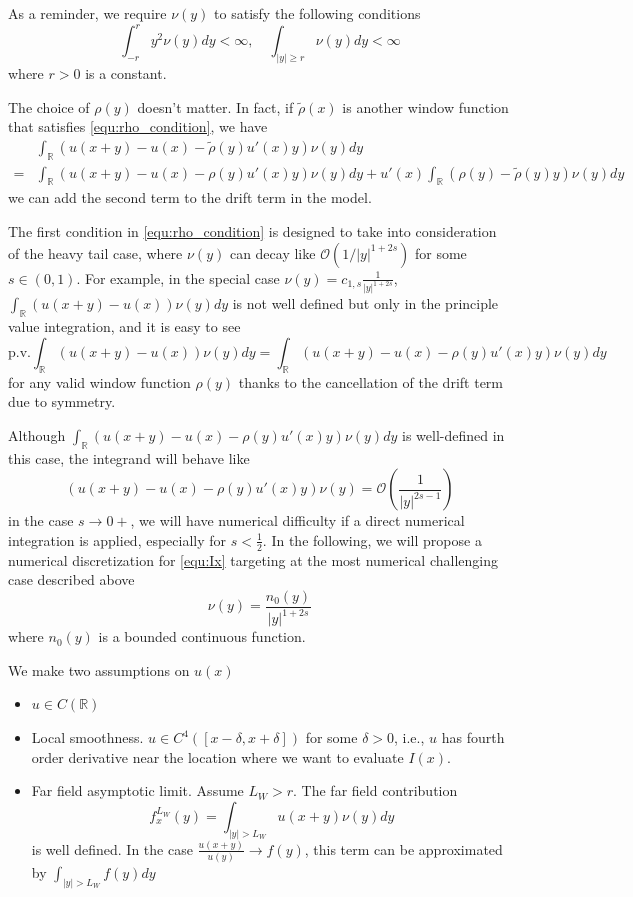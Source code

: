 \documentclass[3p,,preprint,12pt]{elsarticle}
\newcommand{\RR}[0]{\mathbb{R}}
\theoremstyle{definition}
\begin{document}
As a reminder, we require $\nu(y)$ to satisfy the following conditions
\begin{equation}\label{equ:ny}
	\int_{-r}^ry^2\nu(y)dy <\infty, \quad \int_{|y|\geq r} \nu(y)dy<\infty
\end{equation} 
where $r>0$ is a constant. 

The choice of $\rho(y)$ doesn't matter. In fact, if $\tilde\rho(x)$ is another window function that satisfies \cref{equ:rho_condition}, we have
\begin{align}
	&\int_{\RR}(u(x+y)-u(x)-\tilde\rho(y)u'(x)y)\nu(y)dy \\
	=& \int_{\RR}(u(x+y)-u(x)-\rho(y)u'(x)y)\nu(y)dy + u'(x)\int_{\RR}(\rho(y)-\tilde\rho(y)y)\nu(y)dy
\end{align}
we can add the second term to the drift term in the model. 

The first condition in \cref{equ:rho_condition} is designed to take into consideration of the heavy tail case, where $\nu(y)$ can decay like $\mathcal{O}(1/|y|^{1+2s})$ for some $s\in (0,1)$. For example, in the special case 	$\nu(y) = c_{1,s}\frac{1}{|y|^{1+2s}}$, $\int_{\RR}(u(x+y)-u(x))\nu(y)dy$ is not well defined but only in the principle value integration, and it is easy to see
\begin{equation}
	\mathrm{p.v.}\int_{\RR}(u(x+y)-u(x))\nu(y)dy = \int_{\RR}(u(x+y)-u(x)-\rho(y)u'(x)y)\nu(y)dy
\end{equation}
for any valid window function $\rho(y)$ thanks to the cancellation of the drift term due to symmetry. 

Although $\int_{\RR}(u(x+y)-u(x)-\rho(y)u'(x)y)\nu(y)dy$ is well-defined in this case, the integrand will behave like 
\begin{equation}
	(u(x+y)-u(x)-\rho(y)u'(x)y)\nu(y) = \mathcal{O}\left(\frac{1}{|y|^{2s-1}}\right)
\end{equation}
in the case $s\rightarrow 0+$, we will have numerical difficulty if a direct numerical integration is applied, especially for $s<\frac{1}{2}$. In the following, we will propose a numerical discretization for \cref{equ:Ix} targeting at the most numerical challenging case described above 
\begin{equation}\label{equ:ny2}
	\nu(y) = \frac{n_0(y)}{|y|^{1+2s}}
\end{equation} 
where $n_0(y)$ is a bounded continuous function. 

We make two assumptions on $u(x)$
\begin{itemize}
	\item $u\in C(\RR)$ 
	\item Local smoothness. $u\in C^4([x-\delta, x+\delta])$ for some $\delta>0$, i.e., $u$ has fourth order derivative near the location where we want to evaluate $I(x)$.
	\item Far field asymptotic limit. Assume $L_W>r$. The far field contribution
	\begin{equation}\label{equ:fxy}
		f_x^{L_W}(y) = \int_{|y|>L_W}u(x+y)\nu(y)dy
	\end{equation}
	is well defined. In the case $\frac{u(x+y)}{u(y)}\rightarrow f(y)$, this term can be approximated by $\int_{|y|>L_W} f(y)dy$
\end{itemize}
\end{document}
